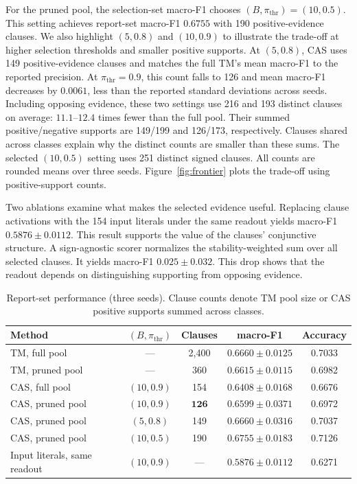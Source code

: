 \documentclass[conference]{IEEEtran}
\begin{document}
For the pruned pool, the selection-set macro-F1 chooses
$(B,\pi_{\mathrm{thr}})=(10,0.5)$. This setting achieves report-set
macro-F1 $0.6755$ with 190 positive-evidence clauses. We also highlight $(5,0.8)$ and $(10,0.9)$ to illustrate the
trade-off at higher selection thresholds and smaller positive supports.
At $(5,0.8)$, CAS uses 149 positive-evidence clauses and matches the full TM's mean macro-F1 to the reported precision. At
$\pi_{\mathrm{thr}}=0.9$, this count falls to 126 and mean macro-F1
decreases by $0.0061$, less than the reported standard deviations
across seeds. Including opposing evidence, these two settings use
216 and 193 distinct clauses on average: $11.1$--$12.4$ times fewer
than the full pool. Their summed positive/negative supports are
149/199 and 126/173, respectively. Clauses shared across classes explain
why the distinct counts are smaller than these sums. The selected $(10,0.5)$ setting uses 251 distinct signed clauses. All counts are
rounded means over three seeds. Figure~\ref{fig:frontier} plots the trade-off using positive-support counts.

Two ablations examine what makes the selected evidence useful.
Replacing clause activations with the 154 input literals under the
same readout yields macro-F1 $0.5876\pm0.0112$. This result supports
the value of the clauses' conjunctive structure. A sign-agnostic scorer
normalizes the stability-weighted sum over all selected clauses.
It yields macro-F1 $0.025\pm0.032$. This drop shows that the readout
depends on distinguishing supporting from opposing evidence.

\begin{table}[t]
\centering
\caption{Report-set performance (three seeds). Clause counts denote
TM pool size or CAS positive supports summed across classes.}
\label{tab:headline}
\footnotesize
\setlength{\tabcolsep}{1pt}
\begin{tabular}{@{}lcccc@{}}
\toprule
Method & $(B,\pi_{\mathrm{thr}})$ & Clauses & macro-F1 & Accuracy \\
\midrule
TM, full pool & --- & 2{,}400 & $0.6660\pm0.0125$ & 0.7033 \\
TM, pruned pool & --- & 360 & $0.6615\pm0.0115$ & 0.6982 \\
CAS, full pool & $(10,0.9)$ & 154 & $0.6408\pm0.0168$ & 0.6676 \\
CAS, pruned pool & $(10,0.9)$ & $\mathbf{126}$ & $0.6599\pm0.0371$ & 0.6972 \\
CAS, pruned pool & $(5,0.8)$ & 149 & $0.6660\pm0.0316$ & 0.7037 \\
CAS, pruned pool & $(10,0.5)$ & 190 & $\mathbf{0.6755\pm0.0183}$ & 0.7126 \\
\midrule
Input literals, same readout & $(10,0.9)$ & --- & $0.5876\pm0.0112$ & 0.6271 \\
\bottomrule
\end{tabular}
\end{table}
\end{document}

